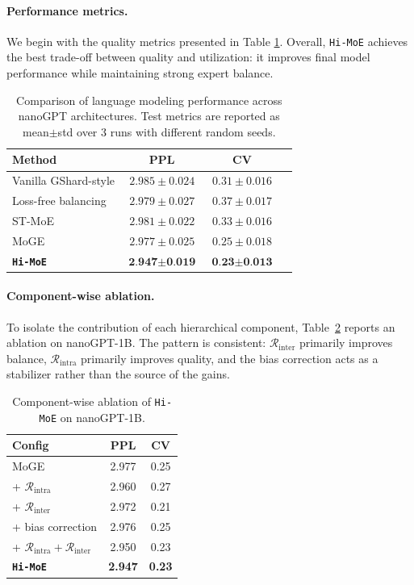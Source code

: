 \documentclass[sigconf,nonacm]{acmart}
\begin{document}
\paragraph{Performance metrics.} We begin with the quality metrics presented in Table \ref{tab:combined_results}.
Overall, \texttt{Hi-MoE} achieves the best trade-off between quality and utilization: it improves final model performance while maintaining strong expert balance.

\begin{table}[!htbp]
\caption{Comparison of language modeling performance across nanoGPT architectures. Test metrics are reported as mean$\pm$std over 3 runs with different random seeds.}
\label{tab:combined_results}
\centering
\setlength{\tabcolsep}{4pt}
\begin{tabular}{lccc}
\toprule
\textbf{Method} & \textbf{PPL} & \textbf{CV}\\
\midrule
Vanilla GShard-style & $2.985\pm 0.024$ & $0.31\pm 0.016$ \\
Loss-free balancing & $2.979\pm 0.027$ & $0.37\pm 0.017$ \\
ST-MoE & $2.981\pm 0.022$ & $0.33\pm 0.016$ \\
MoGE& $2.977\pm 0.025$ & $0.25\pm 0.018$ \\
\midrule
\textbf{\texttt{Hi-MoE}} & $\textbf{2.947}\pm \textbf{0.019}$ & $\textbf{0.23}\pm \textbf{0.013}$ \\
\bottomrule
\end{tabular}
\end{table}

\paragraph{Component-wise ablation.} To isolate the contribution of each hierarchical component, Table~\ref{tab:nanogpt_ablation} reports an ablation on nanoGPT-1B. The pattern is consistent: $\mathcal{R}_{\text{inter}}$ primarily improves balance, $\mathcal{R}_{\text{intra}}$ primarily improves quality, and the bias correction acts as a stabilizer rather than the source of the gains.

\begin{table}[!htbp]
\caption{Component-wise ablation of \texttt{Hi-MoE} on nanoGPT-1B.}
\label{tab:nanogpt_ablation}
\centering
\setlength{\tabcolsep}{5pt}
\begin{tabular}{lcc}
\toprule
\textbf{Config} & \textbf{PPL} & \textbf{CV} \\
\midrule
MoGE & 2.977 & 0.25 \\
+ $\mathcal{R}_{\text{intra}}$ & 2.960 & 0.27 \\
+ $\mathcal{R}_{\text{inter}}$ & 2.972 & 0.21 \\
+ bias correction & 2.976 & 0.25 \\
+ $\mathcal{R}_{\text{intra}} + \mathcal{R}_{\text{inter}}$ & 2.950 & 0.23 \\
\midrule
\textbf{\texttt{Hi-MoE}} & \textbf{2.947} & \textbf{0.23} \\
\bottomrule
\end{tabular}
\end{table}
\end{document}
